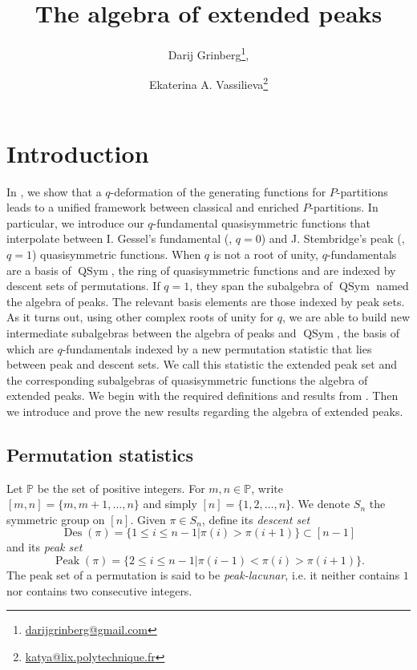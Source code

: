 \documentclass[submission]{FPSAC2023}
\title[Extended peaks]{The algebra of extended peaks}
\author[D. Grinberg \and E.A. Vassilieva]{Darij Grinberg\thanks{\href{mailto:darijgrinberg@gmail.com}{darijgrinberg@gmail.com}}\addressmark{1}, \and Ekaterina A. Vassilieva\thanks{\href{mailto:katya@lix.polytechnique.fr}{katya@lix.polytechnique.fr}}\addressmark{2}}
\newcommand{\PP}{\mathbb{P}} %
\newcommand{\QSym}{\operatorname{QSym}}
\newcommand{\Des}{\operatorname{Des}}
\newcommand{\Peak}{\operatorname{Peak}}
\begin{document}
\maketitle
\section{Introduction}
In \cite{GriVas22}, we show that a $q$-deformation of the generating functions for $P$-partitions leads to a unified framework between classical and enriched $P$-partitions. In particular, we introduce our $q$-fundamental quasisymmetric functions that interpolate between I. Gessel's fundamental (\cite{Ges84}, $q=0$) and J. Stembridge's peak (\cite{Ste97}, $q=1$) quasisymmetric functions. When $q$ is not a root of unity, $q$-fundamentals are a basis of $\QSym$, the ring of quasisymmetric functions and are indexed by descent sets of permutations. If $q=1$, they span the subalgebra of $\QSym$ named the algebra of peaks. The relevant basis elements are those indexed by peak sets. As it turns out, using other complex roots of unity for $q$, we are able to build new intermediate subalgebras between the algebra of peaks and $\QSym$, the basis of which are $q$-fundamentals indexed by a new permutation statistic that lies between peak and descent sets. We call this statistic the extended peak set and the corresponding subalgebras of quasisymmetric functions the algebra of extended peaks. We begin with the required definitions and results from \cite{GriVas22}. Then we introduce and prove the new results regarding the algebra of extended peaks. 
\subsection{Permutation statistics}
Let $\PP$ be the set of positive integers. For $m, n \in \PP$, write $[m,n] = \{m, m+1, \dots, n\}$ and simply $[n] = \{1, 2, \dots, n\}$. We denote $S_n$ the symmetric group on $[n]$. Given $\pi \in S_n$, define its \emph{descent set} $$\Des(\pi)= \{1\leq i\leq n-1| \pi(i)>\pi(i+1)\} \subset [n-1]$$ and its \emph{peak set} $$\Peak(\pi) = \{2\leq i\leq n-1| \pi(i-1)<\pi(i)>\pi(i+1)\}.$$ The peak set of a permutation is said to be \emph{peak-lacunar}, i.e. it neither contains $1$ nor contains two consecutive integers.
\end{document}
